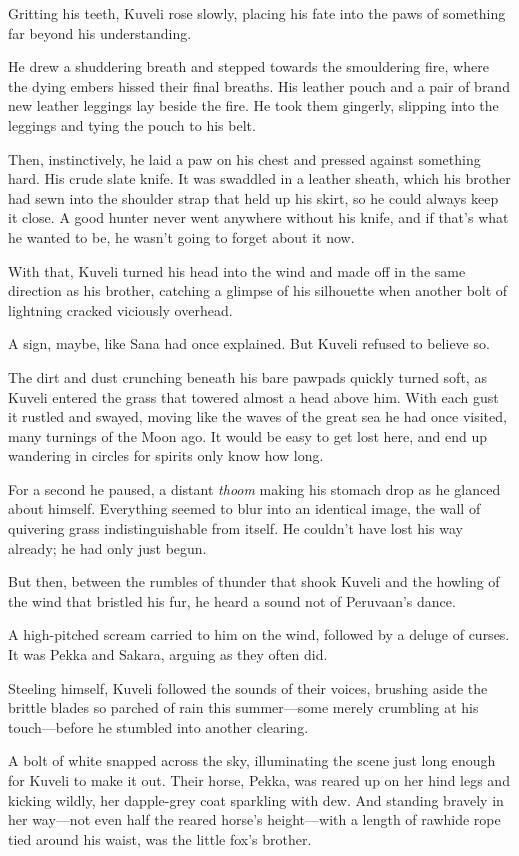 Gritting his teeth, Kuveli rose slowly, placing his fate into the paws of something far beyond his understanding.

He drew a shuddering breath and stepped towards the smouldering fire, where the dying embers hissed their final breaths. His leather pouch and a pair of brand new leather leggings lay beside the fire. He took them gingerly, slipping into the leggings and tying the pouch to his belt.

Then, instinctively, he laid a paw on his chest and pressed against something hard. His crude slate knife. It was swaddled in a leather sheath, which his brother had sewn into the shoulder strap that held up his skirt, so he could always keep it close. A good hunter never went anywhere without his knife, and if that's what he wanted to be, he wasn't going to forget about it now.

With that, Kuveli turned his head into the wind and made off in the same direction as his brother, catching a glimpse of his silhouette when another bolt of lightning cracked viciously overhead.

A sign, maybe, like Sana had once explained. But Kuveli refused to believe so.

The dirt and dust crunching beneath his bare pawpads quickly turned soft, as Kuveli entered the grass that towered almost a head above him. With each gust it rustled and swayed, moving like the waves of the great sea he had once visited, many turnings of the Moon ago. It would be easy to get lost here, and end up wandering in circles for spirits only know how long.

For a second he paused, a distant \emph{thoom} making his stomach drop as he glanced about himself. Everything seemed to blur into an identical image, the wall of quivering grass indistinguishable from itself. He couldn't have lost his way already; he had only just begun.

But then, between the rumbles of thunder that shook Kuveli and the howling of the wind that bristled his fur, he heard a sound not of Peruvaan's dance.

A high-pitched scream carried to him on the wind, followed by a deluge of curses. It was Pekka and Sakara, arguing as they often did.

Steeling himself, Kuveli followed the sounds of their voices, brushing aside the brittle blades so parched of rain this summer---some merely crumbling at his touch---before he stumbled into another clearing.

A bolt of white snapped across the sky, illuminating the scene just long enough for Kuveli to make it out. Their horse, Pekka, was reared up on her hind legs and kicking wildly, her dapple-grey coat sparkling with dew. And standing bravely in her way---not even half the reared horse's height---with a length of rawhide rope tied around his waist, was the little fox's brother.

